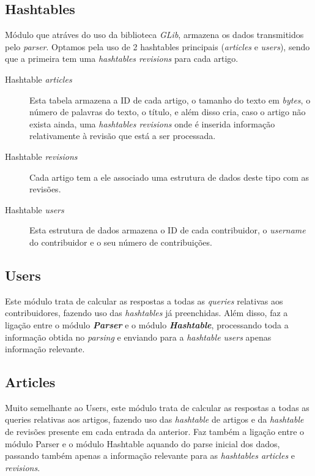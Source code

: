 \documentclass[a4paper]{article}
\begin{document}
\subsection{Hashtables}
Módulo que atráves do uso da biblioteca \textit{GLib}, armazena os dados transmitidos pelo \textit{parser}. Optamos pela uso de 2 hashtables principais (\textit{articles} e \textit{users}), sendo que a primeira tem uma \textit{hashtables revisions} para cada artigo.
\begin{description}
    \item[Hashtable \textit{articles}] Esta tabela armazena a ID de cada artigo, o tamanho do texto em \textit{bytes}, o número de palavras do texto, o título, e além disso cria, caso o artigo não exista ainda, uma \textit{hashtables revisions} onde é inserida informação relativamente à revisão que está a ser processada.

    \item[Hashtable \textit{revisions}] Cada artigo tem a ele associado uma estrutura de dados deste tipo com as revisões.

    \item[Hashtable \textit{users}] Esta estrutura de dados armazena o ID de cada contribuidor, o \textit{username} do contribuidor e o seu número de contribuições.

\end{description}

\subsection{Users}
 Este módulo trata de calcular as respostas a todas as \textit{queries} relativas aos contribuidores, fazendo uso das \textit{hashtables} já preenchidas. Além disso, faz a ligação entre o módulo \textbf{\textit{Parser}} e o módulo \textbf{\textit{Hashtable}}, processando toda a informação obtida no \textit{parsing} e enviando para a \textit{hashtable users} apenas informação relevante.

\subsection{Articles}
 Muito semelhante ao Users, este módulo trata de calcular as respostas a todas as queries relativas aos artigos, fazendo uso das \textit{hashtable} de artigos e da \textit{hashtable} de revisões presente em cada entrada da anterior. Faz também a ligação entre o módulo Parser e o módulo Hashtable aquando do parse inicial dos dados, passando também apenas a informação relevante para as \textit{hashtables articles} e \textit{revisions}.
\end{document}
